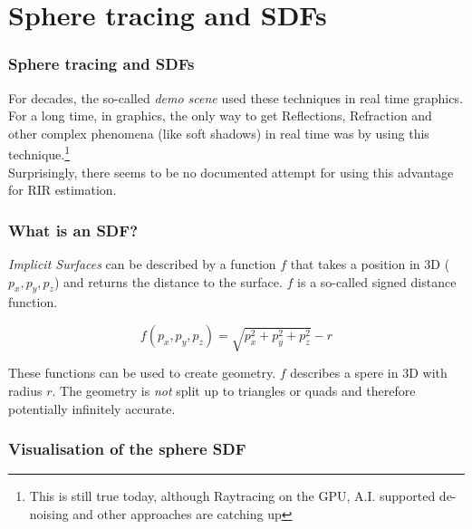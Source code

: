 \documentclass[aspectratio=169]{beamer}
\begin{document}
\section{Sphere tracing and SDFs}
\begin{frame}
\frametitle{Sphere tracing and SDFs}
For decades, the so-called \textit{demo scene} used these techniques in real time graphics.
For a long time, in graphics, the only way to get Reflections, Refraction and other complex phenomena (like soft shadows) in real time was by using this technique.\footnote{This is still true today, although Raytracing on the GPU, A.I. supported de-noising and other approaches are catching up} \\
\vspace{1cm}
Surprisingly, there seems to be no documented attempt for using this advantage for RIR estimation.

\end{frame}


\begin{frame}
\frametitle{What is an SDF?}
\textit{Implicit Surfaces} can be described by a function $f$ that takes a position in 3D ($p_x, p_y, p_z$) and returns the distance to the surface. $f$ is a so-called signed distance function. 

\begin{equation}
  f(p_x, p_y, p_z) = \sqrt{p_x^2 + p_y^2 + p_z^2} -r
  \label{eq:eq1}
\end{equation}

These functions can be used to create geometry. $f$ describes a spere in 3D with radius $r$.
The geometry is \textit{not} split up to triangles or quads and therefore potentially infinitely accurate.

\end{frame}


\begin{frame}
\frametitle{Visualisation of the sphere SDF}

\end{frame}
\end{document}
